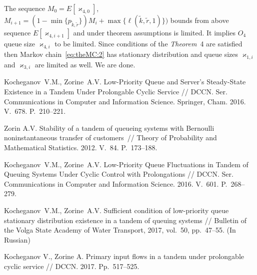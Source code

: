 The sequence $M_0=E[\varkappa_{4,0}]$, $M_{i+1}= (1-\min{\{p_{\tilde{k},\tilde{r}}\}})  M_{i} + \max{\{\ell(\tilde{k},\tilde{r},1)\}} ) $ bounds from above sequence $E[\varkappa_{4,i+1}]$ and under theorem assumptions is limited. It implies $O_4$ queue size $\varkappa_{4,i}$ to be limited. Since conditions of the \textit{Theorem}~4 are satisfied then Markov chain~\eqref{eq:theMC:2} has stationary distribution and queue sizes $\varkappa_{1,i}$ and $\varkappa_{3,i}$ are limited as well. We are done.

\begin{references_eng}

\item
Kocheganov~V.M., Zorine~A.V. Low-Priority Queue and Server's Steady-State Existence in a Tandem Under Prolongable Cyclic Service // DCCN. Ser. Communications in Computer and Information Science. Springer, Cham. 2016. V.~678. P.~210--221.
\item
  Zorin A.V. Stability of a tandem of queueing systems with Bernoulli noninstantaneous transfer of
  customers~// Theory of Probability and Mathematical Statistics. 2012. V.~84. P.~173--188.
\item
Kocheganov~V.M., Zorine~A.V. Low-Priority Queue Fluctuations in Tandem of Queuing Systems Under Cyclic Control with Prolongations // DCCN. Ser. Communications in Computer and Information Science. 2016. V.~601. P.~268--279.
\item 
Kocheganov~V.M., Zorine~A.V. Sufficient condition of low-priority queue stationary distribution existence in a tandem of queuing systems // Bulletin of the Volga State Academy of Water Transport, 2017, vol.~50, pp.~47--55. (In Russian)
\item
Kocheganov V., Zorine A. Primary input flows in a tandem under prolongable cyclic service // DCCN. 2017. Pp.~517--525.







\end{references_eng}

